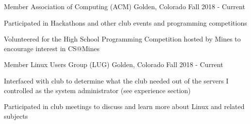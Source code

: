 \begin{cventries}
    \ifcv

    \cventry
    {Member}
    {Association of Computing (ACM)}
    {Golden, Colorado}
    {Fall 2018 - Current}
    {
      \begin{cvitems}
        \item Participated in Hackathons and other club events and programming competitions
        \item Volunteered for the High School Programming Competition hosted by Mines to encourage interest in CS@Mines
      \end{cvitems}
    }

    \cventry
    {Member}
    {Linux Users Group (LUG)}
    {Golden, Colorado}
    {Fall 2018 - Current}
    {
      \begin{cvitems}
        \item Interfaced with club to determine what the club needed out of the servers I controlled as the system administrator (see experience section)
        \item {Participated in club meetings to discuss and learn more about Linux and related subjects}
      \end{cvitems}
    }
    \fi

\end{cventries}
